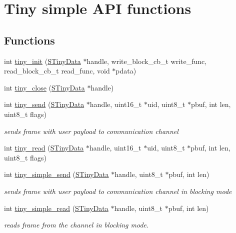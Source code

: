 \hypertarget{group__SIMPLE__API}{}\section{Tiny simple A\+P\+I functions}
\label{group__SIMPLE__API}
\subsection*{Functions}
\begin{DoxyCompactItemize}
\item 
int \hyperlink{group__SIMPLE__API_gab9bfaed3c75551c8b7f3f8b25e766546}{tiny\+\_\+init} (\hyperlink{structSTinyData}{S\+Tiny\+Data} $\ast$handle, write\+\_\+block\+\_\+cb\+\_\+t write\+\_\+func, read\+\_\+block\+\_\+cb\+\_\+t read\+\_\+func, void $\ast$pdata)
\item 
int \hyperlink{group__SIMPLE__API_ga48cf9ffab9eeb9665e61ae69e28938b8}{tiny\+\_\+close} (\hyperlink{structSTinyData}{S\+Tiny\+Data} $\ast$handle)
\item 
int \hyperlink{group__SIMPLE__API_ga988a41addbe75dc15cc13006de6740e0}{tiny\+\_\+send} (\hyperlink{structSTinyData}{S\+Tiny\+Data} $\ast$handle, uint16\+\_\+t $\ast$uid, uint8\+\_\+t $\ast$pbuf, int len, uint8\+\_\+t flags)
\begin{DoxyCompactList}\small\item\em sends frame with user payload to communication channel \end{DoxyCompactList}\item 
int \hyperlink{group__SIMPLE__API_ga470d59a60a496944e63031ba43a00e3d}{tiny\+\_\+read} (\hyperlink{structSTinyData}{S\+Tiny\+Data} $\ast$handle, uint16\+\_\+t $\ast$uid, uint8\+\_\+t $\ast$pbuf, int len, uint8\+\_\+t flags)
\item 
int \hyperlink{group__SIMPLE__API_gafae39ccf72f1f22f4dc47bd54998e88c}{tiny\+\_\+simple\+\_\+send} (\hyperlink{structSTinyData}{S\+Tiny\+Data} $\ast$handle, uint8\+\_\+t $\ast$pbuf, int len)
\begin{DoxyCompactList}\small\item\em sends frame with user payload to communication channel in blocking mode \end{DoxyCompactList}\item 
int \hyperlink{group__SIMPLE__API_gac9eaac50ab16b9891ca74e5c5e46b778}{tiny\+\_\+simple\+\_\+read} (\hyperlink{structSTinyData}{S\+Tiny\+Data} $\ast$handle, uint8\+\_\+t $\ast$pbuf, int len)
\begin{DoxyCompactList}\small\item\em reads frame from the channel in blocking mode. \end{DoxyCompactList}\end{DoxyCompactItemize}


